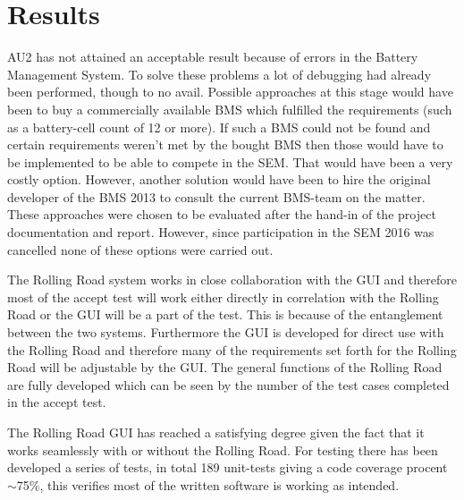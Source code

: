 \chapter{Results}
AU2 has not attained an acceptable result because of errors in the Battery Management System. To solve these problems a lot of debugging had already been performed, though to no avail. Possible approaches at this stage would have been to buy a commercially available BMS which fulfilled the requirements (such as a battery-cell count of 12 or more). If such a BMS could not be found and certain requirements weren't met by the bought BMS then those would have to be implemented to be able to compete in the SEM. That would have been a very costly option. However, another solution would have been to hire the original developer of the BMS 2013 to consult the current BMS-team on the matter. These approaches were chosen to be evaluated after the hand-in of the project documentation and report. However, since participation in the SEM 2016 was cancelled none of these options were carried out. 

The Rolling Road system works in close collaboration with the GUI and therefore most of the accept test will work either directly in correlation with the Rolling Road or the GUI will be a part of the test. This is because of the entanglement between the two systems. Furthermore the GUI is developed for direct use with the Rolling Road and therefore many of the requirements set forth for the Rolling Road will be adjustable by the GUI. The general functions of the Rolling Road are fully developed which can be seen by the number of the test cases completed in the accept test.

The Rolling Road GUI has reached a satisfying degree given the fact that it works seamlessly with or without the Rolling Road. For testing there has been developed a series of tests, in total 189 unit-tests giving a code coverage procent $\sim$75\%, this verifies most of the written software is working as intended. 

